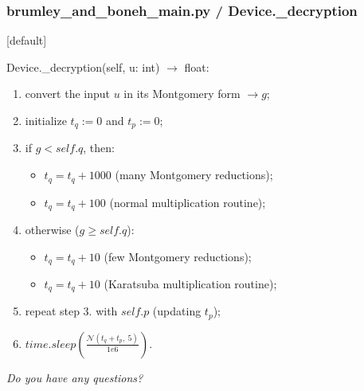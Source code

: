 \documentclass{beamer}
\begin{document}
\begin{frame}
\frametitle{brumley\_and\_boneh\_main.py / Device.\_decryption}
[default]

Device.\_decryption(self, u: int) $\rightarrow$ float:

\begin{enumerate}

\item convert the input $u$ in its Montgomery form $\rightarrow g$;
\item initialize $t_q := 0$ and $t_p := 0$;
\item if $g < self.q$, then:
  \begin{itemize}
    \item $t_q = t_q + 1000$ (many Montgomery reductions);
    \item $t_q = t_q + 100$ (normal multiplication routine);
  \end{itemize}
\item[] otherwise ($g \ge self.q$):
  \begin{itemize}
    \item $t_q = t_q + 10$ (few Montgomery reductions);
    \item $t_q = t_q + 10$ (Karatsuba multiplication routine);
  \end{itemize}
\item repeat step 3. with $self.p$ (updating $t_p$);
\item $time.sleep(\frac{\mathcal{N}(t_q + t_p,\ 5)}{1e6})$.
\end{enumerate}

\end{frame}
\begin{frame}[c,noframenumbering]

  \LARGE \emph{Do you have any questions?}

\end{frame}
\begingroup
\footnotesize
\end{document}
